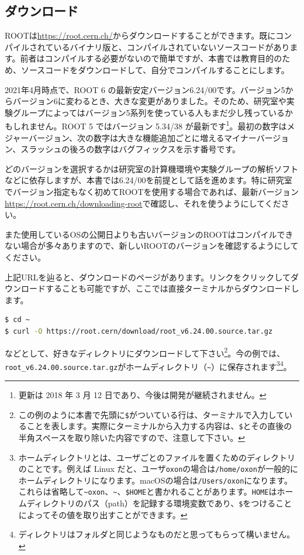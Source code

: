 \subsection{ダウンロード}
\label{subsec:download}
ROOTは\url{https://root.cern.ch/}からダウンロードすることができます。既にコンパイルされているバイナリ版と、コンパイルされていないソースコードがあります。前者はコンパイルする必要がないので簡単ですが、本書では教育目的のため、ソースコードをダウンロードして、自分でコンパイルすることにします。

2021年4月時点で、ROOT 6 の最新安定バージョン6.24/00です。バージョン5からバージョン6に変わるとき、大きな変更がありました。そのため、研究室や実験グループによってはバージョン5系列を使っている人もまだ少し残っているかもしれません。ROOT 5 ではバージョン 5.34/38 が最新です\footnote{更新は 2018 年 3 月 12 日であり、今後は開発が継続されません。}。最初の数字はメジャーバージョン、次の数字は大きな機能追加ごとに増えるマイナーバージョン、スラッシュの後ろの数字はバグフィックスを示す番号です。

どのバージョンを選択するかは研究室の計算機環境や実験グループの解析ソフトなどに依存しますが、本書では6.24/00を前提として話を進めます。特に研究室でバージョン指定もなく初めてROOTを使用する場合であれば、最新バージョン\url{https://root.cern.ch/downloading-root}で確認し、それを使うようにしてください。

また使用しているOSの公開日よりも古いバージョンのROOTはコンパイルできない場合が多々ありますので、新しいROOTのバージョンを確認するようにしてください。

上記URLを辿ると、ダウンロードのページがあります。リンクをクリックしてダウンロードすることも可能ですが、ここでは直接ターミナルからダウンロードします。
\begin{lstlisting}[language=bash]
$ cd ~
$ curl -O https://root.cern/download/root_v6.24.00.source.tar.gz
\end{lstlisting}
などとして、好きなディレクトリにダウンロードして下さい\footnote{この例のように本書で先頭に\texttt{\$}がついている行は、ターミナルで入力していることを表します。実際にターミナルから入力する内容は、\texttt{\$}とその直後の半角スペースを取り除いた内容ですので、注意して下さい。}。今の例では、\texttt{root\_v6.24.00.source.tar.gz}がホームディレクトリ（\texttt{\~}）に保存されます\footnote{ホームディレクトリとは、ユーザごとのファイルを置くためのディレクトリのことです。例えば Linux だと、ユーザ\texttt{oxon}の場合は\texttt{/home/oxon}が一般的にホームディレクトリになります。macOSの場合は\texttt{/Users/oxon}になります。これらは省略して\texttt{{\textasciitilde}oxon}、\texttt{\textasciitilde}、\texttt{\$HOME}と書かれることがあります。\texttt{HOME}はホームディレクトリのパス（path）を記録する環境変数であり、\texttt{\$}をつけることによってその値を取り出すことができます。}\footnote{ディレクトリはフォルダと同じようなものだと思ってもらって構いません。}。

